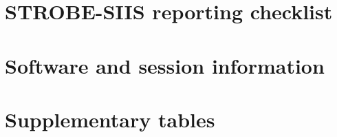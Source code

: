 \documentclass[11pt]{article}
\begin{document}



\appendix

\section{STROBE-SIIS reporting checklist}
\label{sec:strobe-checklist}


\section{Software and session information}
\label{sec:session-info}


\section{Supplementary tables}
\label{sec:supplement}

\end{document}
